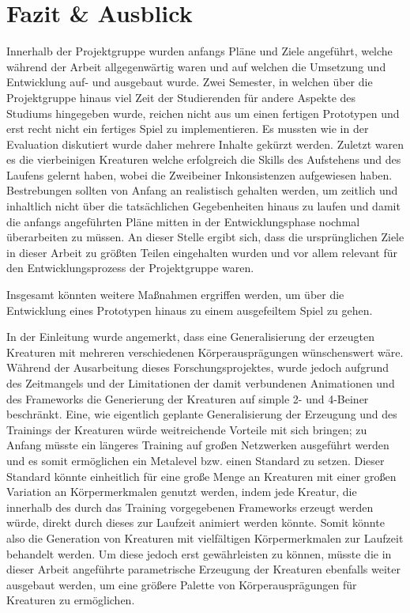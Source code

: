 \chapter{Fazit \& Ausblick}
\label{Ausblick}

Innerhalb der Projektgruppe wurden anfangs Pläne und Ziele angeführt, welche während der Arbeit allgegenwärtig waren und auf welchen die Umsetzung und Entwicklung auf- und ausgebaut wurde. Zwei Semester, in welchen über die Projektgruppe hinaus viel Zeit der Studierenden für andere Aspekte des Studiums hingegeben wurde, reichen nicht aus um einen fertigen Prototypen und erst recht nicht ein fertiges Spiel zu implementieren. Es mussten wie in der Evaluation diskutiert wurde daher mehrere Inhalte gekürzt werden. Zuletzt waren es die vierbeinigen Kreaturen welche erfolgreich die Skills des Aufstehens und des Laufens gelernt haben, wobei die Zweibeiner Inkonsistenzen aufgewiesen haben. Bestrebungen sollten von Anfang an realistisch gehalten werden, um zeitlich und inhaltlich nicht über die tatsächlichen Gegebenheiten hinaus zu laufen und damit die anfangs angeführten Pläne mitten in der Entwicklungsphase nochmal überarbeiten zu müssen. An dieser Stelle ergibt sich, dass die ursprünglichen Ziele in dieser Arbeit zu größten Teilen eingehalten wurden und vor allem relevant für den Entwicklungsprozess der Projektgruppe waren.

Insgesamt könnten weitere Maßnahmen ergriffen werden, um über die Entwicklung eines Prototypen hinaus zu einem ausgefeiltem Spiel zu gehen.

In der Einleitung wurde angemerkt, dass eine Generalisierung der erzeugten Kreaturen mit mehreren verschiedenen Körperausprägungen wünschenswert wäre. Während der Ausarbeitung dieses Forschungsprojektes, wurde jedoch aufgrund des Zeitmangels und der Limitationen der damit verbundenen Animationen und des Frameworks die Generierung der Kreaturen auf simple 2- und 4-Beiner beschränkt. Eine, wie eigentlich geplante Generalisierung der Erzeugung und des Trainings der Kreaturen würde weitreichende Vorteile mit sich bringen; zu Anfang müsste ein längeres Training auf großen Netzwerken ausgeführt werden und es somit ermöglichen ein Metalevel bzw. einen Standard zu setzen. Dieser Standard könnte einheitlich für eine große Menge an Kreaturen mit einer großen Variation an Körpermerkmalen genutzt werden, indem jede Kreatur, die innerhalb des durch das Training vorgegebenen Frameworks erzeugt werden würde, direkt durch dieses zur Laufzeit animiert werden könnte. Somit könnte also die Generation von Kreaturen mit vielfältigen Körpermerkmalen zur Laufzeit behandelt werden. Um diese jedoch erst gewährleisten zu können, müsste die in dieser Arbeit angeführte parametrische Erzeugung der Kreaturen ebenfalls weiter ausgebaut werden, um eine größere Palette von Körperausprägungen für Kreaturen zu ermöglichen.

